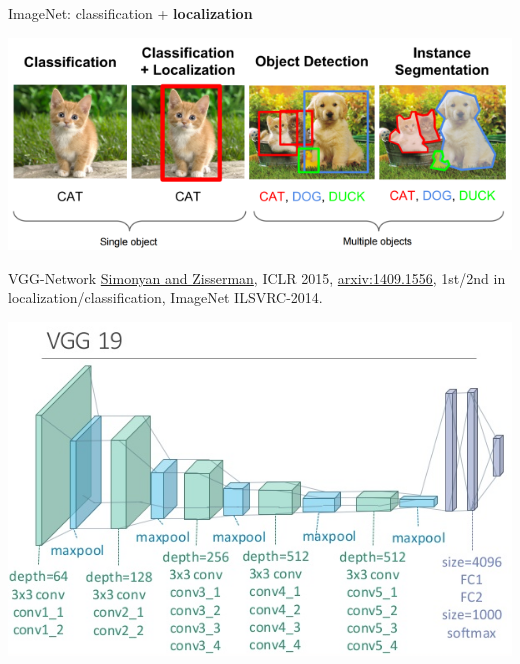 \documentclass[12pt,t]{beamer}
\begin{document}
\begin{frame}

ImageNet: classification + {\bf localization}

\centerline{
\includegraphics[height=0.5\textheight]{./images/LocalizationDetection.png} 
}

\end{frame}





\begin{frame}{VGG-Network}
\href{http://www.robots.ox.ac.uk/~vgg/research/very_deep/}{\color{blue} Simonyan and Zisserman},  ICLR 2015, 
\href{https://arxiv.org/abs/1409.1556}{\color{blue}arxiv:1409.1556},  1st/2nd in localization/classification, ImageNet ILSVRC-2014.

 \centerline{
\includegraphics[height=0.7\textheight]{./images/vgg19.png} 
}

\end{frame}
\end{document}
